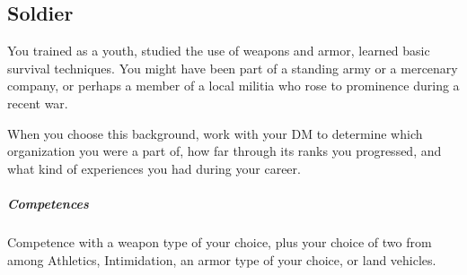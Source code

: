 \thispagestyle{empty}

\subsection*{Soldier} \label{ssec::soldier}
    You trained as a youth, studied the use of weapons and armor, learned basic survival techniques. %
    You might have been part of a standing army or a mercenary company, or perhaps a member of a local militia who rose to prominence during a recent war.

    \newpage

    When you choose this background, work with your DM to determine which organization you were a part of, how far through its ranks you progressed, and what kind of experiences you had during your career.

    \subparagraph{Competences} Competence with a weapon type of your choice, plus your choice of two from among Athletics, Intimidation, an armor type of your choice, or land vehicles.

